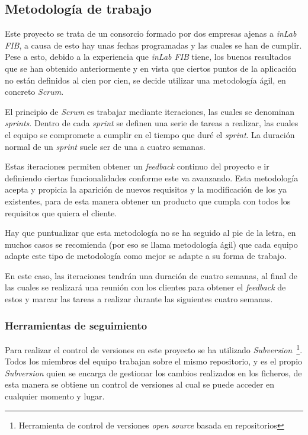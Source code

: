 \subsection{Metodología de trabajo}\label{sec:metodologia}
Este proyecto se trata de un consorcio formado por dos empresas ajenas a \textit{inLab FIB}, a causa de esto hay unas fechas programadas y las cuales se han de cumplir. Pese a esto, debido a la experiencia que \textit{inLab FIB} tiene, los buenos resultados que se han obtenido anteriormente y en vista que ciertos puntos de la aplicación no están definidos al cien por cien, se decide utilizar una metodología ágil, en concreto \textit{Scrum}.

El principio de \textit{Scrum} es trabajar mediante iteraciones, las cuales se denominan \textit{sprints}. Dentro de cada \textit{sprint} se definen una serie de tareas a realizar, las cuales el equipo se compromete a cumplir en el tiempo que duré el \textit{sprint}. La duración normal de un \textit{sprint} suele ser de una a cuatro semanas.

Estas iteraciones permiten obtener un \textit{feedback} continuo del proyecto e ir definiendo ciertas funcionalidades conforme este va avanzando. Esta metodología acepta y propicia la aparición de nuevos requisitos y la modificación de los ya existentes, para de esta manera obtener un producto que cumpla con todos los requisitos que quiera el cliente. 

Hay que puntualizar que esta metodología no se ha seguido al pie de la letra, en muchos casos se recomienda (por eso se llama metodología ágil) que cada equipo adapte este tipo de metodología como mejor se adapte a su forma de trabajo.

En este caso, las iteraciones tendrán una duración de cuatro semanas, al final de las cuales se realizará una reunión con los clientes para obtener el \textit{feedback} de estos y marcar las tareas a realizar durante las siguientes cuatro semanas.

\subsubsection{Herramientas de seguimiento}
Para realizar el control de versiones en este proyecto se ha utilizado \textit{Subversion~\cite{subversion}}\footnote{Herramienta de control de versiones \textit{open source} basada en repositorios}. Todos los miembros del equipo trabajan sobre el mismo repositorio, y es el propio \textit{Subversion} quien se encarga de gestionar los cambios realizados en los ficheros, de esta manera se obtiene un control de versiones al cual se puede acceder en cualquier momento y lugar.

